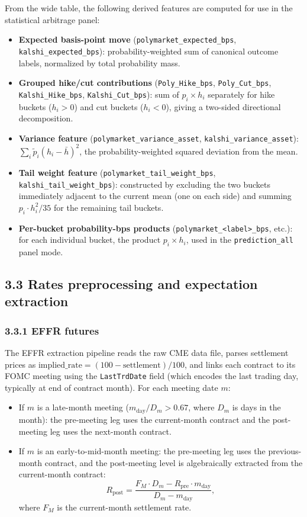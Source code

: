 From the wide table, the following derived features are computed for use in the statistical arbitrage panel:
\begin{itemize}
    \item \textbf{Expected basis-point move} (\texttt{polymarket\_expected\_bps}, \texttt{kalshi\_expected\_bps}): probability-weighted sum of canonical outcome labels, normalized by total probability mass.
    \item \textbf{Grouped hike/cut contributions} (\texttt{Poly\_Hike\_bps}, \texttt{Poly\_Cut\_bps}, \texttt{Kalshi\_Hike\_bps}, \texttt{Kalshi\_Cut\_bps}): sum of $p_i \times h_i$ separately for hike buckets ($h_i > 0$) and cut buckets ($h_i < 0$), giving a two-sided directional decomposition.
    \item \textbf{Variance feature} (\texttt{polymarket\_variance\_asset}, \texttt{kalshi\_variance\_asset}): $\sum_i \tilde{p}_i (h_i - \bar{h})^2$, the probability-weighted squared deviation from the mean.
    \item \textbf{Tail weight feature} (\texttt{polymarket\_tail\_weight\_bps}, \texttt{kalshi\_tail\_weight\_bps}): constructed by excluding the two buckets immediately adjacent to the current mean (one on each side) and summing $p_i \cdot h_i^2 / 35$ for the remaining tail buckets.
    \item \textbf{Per-bucket probability-bps products} (\texttt{polymarket\_<label>\_bps}, etc.): for each individual bucket, the product $p_i \times h_i$, used in the \texttt{prediction\_all} panel mode.
\end{itemize}

\subsection*{3.3 Rates preprocessing and expectation extraction}

\subsubsection*{3.3.1 EFFR futures}

The EFFR extraction pipeline reads the raw CME data file, parses settlement prices as $\text{implied\_rate} = (100 - \text{settlement})/100$, and links each contract to its FOMC meeting using the \texttt{LastTrdDate} field (which encodes the last trading day, typically at end of contract month). For each meeting date $m$:

\begin{itemize}
    \item If $m$ is a late-month meeting ($m_\text{day}/D_m > 0.67$, where $D_m$ is days in the month): the pre-meeting leg uses the current-month contract and the post-meeting leg uses the next-month contract.
    \item If $m$ is an early-to-mid-month meeting: the pre-meeting leg uses the previous-month contract, and the post-meeting level is algebraically extracted from the current-month contract:
\[
R_\text{post} = \frac{F_M \cdot D_m - R_\text{pre} \cdot m_\text{day}}{D_m - m_\text{day}},
\]
where $F_M$ is the current-month settlement rate.
\end{itemize}

